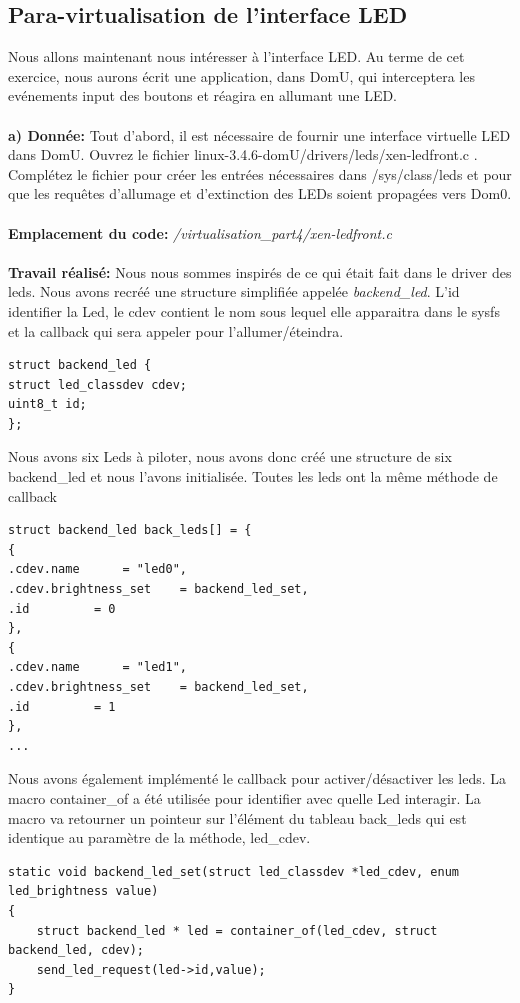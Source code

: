 \subsection{Para-virtualisation de l'interface LED}
Nous allons maintenant nous intéresser à l’interface LED. Au terme de cet exercice, nous aurons écrit
une application, dans DomU, qui interceptera les evénements input des boutons et réagira en allumant
une LED.\\\\
\textbf{a) Donnée: }Tout d’abord, il est nécessaire de fournir une interface virtuelle LED dans DomU. Ouvrez le
fichier linux-3.4.6-domU/drivers/leds/xen-ledfront.c . Complétez le fichier pour créer les entrées
nécessaires dans /sys/class/leds et pour que les requêtes d’allumage et d’extinction des LEDs
soient propagées vers Dom0.\\\\
\textbf{Emplacement du code: }\textit{/virtualisation\_part4/xen-ledfront.c}\\\\
\textbf{Travail réalisé: }Nous nous sommes inspirés de ce qui était fait dans le driver des leds. Nous avons recréé une structure simplifiée appelée \textit{backend\_led}. L'id identifier la Led, le cdev contient le nom sous lequel elle apparaitra dans le sysfs et la callback qui sera appeler pour l'allumer/éteindra.
\begin{lstlisting}
struct backend_led {
struct led_classdev cdev;
uint8_t id;
};
\end{lstlisting}
Nous avons six Leds à piloter, nous avons donc créé une structure de six backend\_led et nous l'avons initialisée. Toutes les leds ont la même méthode de callback
\begin{lstlisting}
struct backend_led back_leds[] = {
{
.cdev.name		= "led0",
.cdev.brightness_set 	= backend_led_set,
.id			= 0
},
{
.cdev.name		= "led1",
.cdev.brightness_set 	= backend_led_set,
.id			= 1
},
...
\end{lstlisting}
Nous avons également implémenté le callback pour activer/désactiver les leds. La macro container\_of a été utilisée pour identifier avec quelle Led interagir. La macro va retourner un pointeur sur l'élément du tableau back\_leds qui est identique au paramètre de la méthode, led\_cdev.
\begin{lstlisting}
static void backend_led_set(struct led_classdev *led_cdev, enum led_brightness value)
{
	struct backend_led * led = container_of(led_cdev, struct backend_led, cdev);
	send_led_request(led->id,value);
}
\end{lstlisting}

